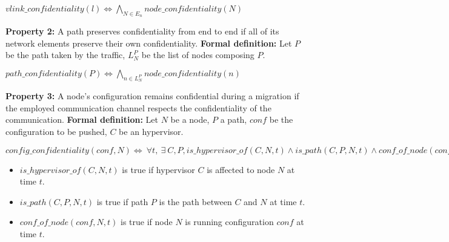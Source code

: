 \begin{myformula}
$vlink\_confidentiality(l) \Leftrightarrow \bigwedge\limits_{N\in E_n} node\_confidentiality(N) $
\end{myformula}

\textbf{Property 2:} A path preserves confidentiality from end to end if all of its network elements preserve their own confidentiality.
\newline \textbf{Formal definition:} Let $P$ be the path taken by the traffic, $L_N^P$ be the list of nodes composing $P$.

\begin{myformula}
$path\_confidentiality(P) \Leftrightarrow \bigwedge\limits_{n \in L_N^P}node\_confidentiality(n)$
\end{myformula}


\textbf{Property 3:} A node's configuration remains confidential during a migration if the employed communication channel respects the confidentiality of the communication.
\newline \textbf{Formal definition:} Let $N$ be a node, $P$ a path, $conf$ be the configuration to be pushed, $C$ be an hypervisor.
\newline

\begin{myformula}
$config\_confidentiality(conf,N) \Leftrightarrow~\forall t,~\exists~C,P, 
is\_hypervisor\_of(C,N,t) \wedge is\_path(C,P,N,t) \wedge  conf\_of\_node(conf,N,t) \Rightarrow
~path\_confidentiality(P) \wedge  node\_confidentiality(N)
$
\end{myformula}


\begin{itemize}
\item $is\_hypervisor\_of(C,N,t)$ is true if hypervisor $C$ is affected to node $N$ at time $t$. 
\item $is\_path(C,P,N,t)$ is true if path $P$ is the path between $C$ and $N$ at time $t$.
\item $conf\_of\_node(conf,N,t)$ is true if node $N$ is running configuration $conf$ at time $t$.
\end{itemize}

